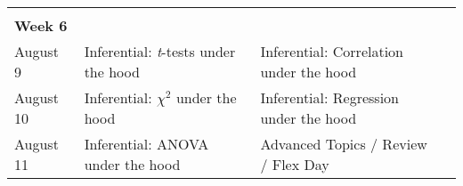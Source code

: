 \documentclass[
]{book}
\begin{document}
\begin{longtable}[]{@{}llll@{}}
\begin{minipage}[t]{0.18\columnwidth}
\strut
\end{minipage}\tabularnewline
\begin{minipage}[t]{0.09\columnwidth}\raggedright
\textbf{Week 6}\strut
\end{minipage} & \begin{minipage}[t]{0.32\columnwidth}\raggedright
\strut
\end{minipage} & \begin{minipage}[t]{0.29\columnwidth}\raggedright
\strut
\end{minipage} & \begin{minipage}[t]{0.18\columnwidth}\raggedright
\strut
\end{minipage}\tabularnewline
\begin{minipage}[t]{0.09\columnwidth}\raggedright
August 9\strut
\end{minipage} & \begin{minipage}[t]{0.32\columnwidth}\raggedright
Inferential: \emph{t}-tests under the hood\strut
\end{minipage} & \begin{minipage}[t]{0.29\columnwidth}\raggedright
Inferential: Correlation under the hood\strut
\end{minipage} & \begin{minipage}[t]{0.18\columnwidth}\raggedright
\strut
\end{minipage}\tabularnewline
\begin{minipage}[t]{0.09\columnwidth}\raggedright
August 10\strut
\end{minipage} & \begin{minipage}[t]{0.32\columnwidth}\raggedright
Inferential: \(\chi^2\) under the hood\strut
\end{minipage} & \begin{minipage}[t]{0.29\columnwidth}\raggedright
Inferential: Regression under the hood\strut
\end{minipage} & \begin{minipage}[t]{0.18\columnwidth}\raggedright
\strut
\end{minipage}\tabularnewline
\begin{minipage}[t]{0.09\columnwidth}\raggedright
August 11\strut
\end{minipage} & \begin{minipage}[t]{0.32\columnwidth}\raggedright
Inferential: ANOVA under the hood\strut
\end{minipage} & \begin{minipage}[t]{0.29\columnwidth}\raggedright
Advanced Topics / Review / Flex Day\strut
\end{minipage} & \begin{minipage}[t]{0.18\columnwidth}\raggedright
\strut
\end{minipage}\tabularnewline
\bottomrule
\end{longtable}
\end{document}
